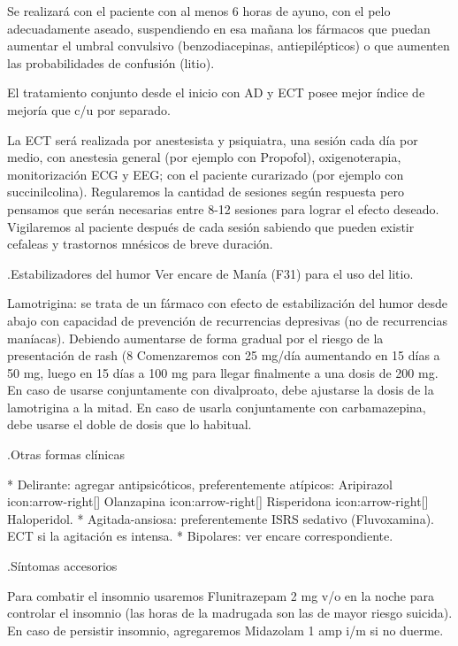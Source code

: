Se realizará con el paciente con al menos 6 horas de ayuno, con el pelo adecuadamente aseado, suspendiendo en esa mañana los fármacos que puedan aumentar el umbral convulsivo (benzodiacepinas, antiepilépticos) o que aumenten las probabilidades de confusión (litio).

El tratamiento conjunto desde el inicio con AD y ECT posee mejor índice de mejoría que c/u por separado.

La ECT será realizada por anestesista y psiquiatra, una sesión cada día por medio, con anestesia general (por ejemplo con Propofol), oxigenoterapia, monitorización ECG y EEG; con el paciente curarizado (por ejemplo con succinilcolina). Regularemos la cantidad de sesiones según respuesta pero pensamos que serán necesarias entre 8-12 sesiones para lograr el efecto deseado. Vigilaremos al paciente después de cada sesión sabiendo que pueden existir cefaleas y trastornos mnésicos de breve duración.

.Estabilizadores del humor
Ver encare de Manía (F31) para el uso del litio.

Lamotrigina: se trata de un fármaco con efecto de estabilización del humor desde abajo con capacidad de prevención de recurrencias depresivas (no de recurrencias maníacas). Debiendo aumentarse de forma gradual por el riesgo de la presentación de rash (8%
Comenzaremos con 25 mg/día aumentando en 15 días a 50 mg, luego en 15 días a 100 mg para llegar finalmente a una dosis de 200 mg. En caso de usarse conjuntamente con divalproato, debe ajustarse la dosis de la lamotrigina a la mitad. En caso de usarla conjuntamente con carbamazepina, debe usarse el doble de dosis que lo habitual.

.Otras formas clínicas

* Delirante: agregar antipsicóticos, preferentemente atípicos: Aripirazol icon:arrow-right[] Olanzapina icon:arrow-right[] Risperidona icon:arrow-right[] Haloperidol.
* Agitada-ansiosa: preferentemente ISRS sedativo (Fluvoxamina). ECT si la agitación es intensa.
* Bipolares: ver encare correspondiente.

.Síntomas accesorios

Para combatir el insomnio usaremos Flunitrazepam 2 mg v/o en la noche para controlar el insomnio (las horas de la madrugada son las de mayor riesgo suicida). En caso de persistir insomnio, agregaremos Midazolam 1 amp i/m si no duerme.

